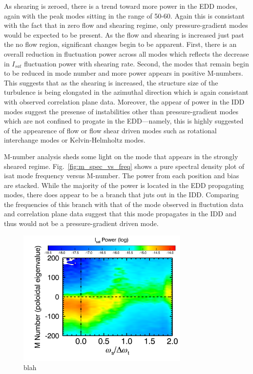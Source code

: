 \documentclass[aip,pop,amsmath,amssymb,preprint,superscriptaddress]{revtex4-1} %
\begin{document}
As shearing is zeroed, there is a trend toward more power in the EDD modes, again with the peak modes sitting in the range of 50-60. Again this is consistant with the fact that in zero flow and shearing regime, only pressure-gradient modes would be expected to be present. As the flow and shearing is increased just past the no flow region, significant changes begin to be apparent. First, there is an overall reduction in fluctuation power across all modes which reflects the decrease in $I_{sat}$ fluctuation power with shearing rate. Second, the modes that remain begin to be reduced in mode number and more power appears in positive M-numbers. This suggests that as the shearing is increased, the structure size of the turbulence is being elongated in the azimuthal direction which is again consistant with observed correlation plane data. Moreover, the appear of power in the IDD modes suggest the presense of instabilities other than pressure-gradient modes which are not confined to progate in the EDD---namely, this is highly suggested of the appearence of flow or flow shear driven modes such as rotational interchange modes or Kelvin-Helmholtz modes.

M-number analysis sheds some light on the mode that appears in the strongly sheared regime. Fig.~\ref{fig:m_spec_vs_freq} shows a pure spectral density plot of isat mode frequency versus M-number. The power from each position and bias are stacked. While the majority of the power is located in the EDD propagating modes, there does appear to be a branch that juts out in the IDD. Comparing the frequencies of this branch with that of the mode observed in fluctution data and correlation plane data suggest that this mode propagates in the IDD and thus would not be a pressure-gradient driven mode.

\begin{figure}[!htbp]
\centerline{
\includegraphics[width=8.5cm]{m_spec_vs_bias}}
\caption{\label{fig:m_spec_vs_bias} blah}
\end{figure}
\end{document}
